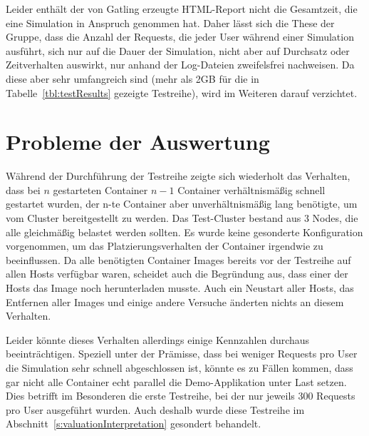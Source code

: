 Leider enth\"alt der von Gatling erzeugte HTML-Report nicht die Gesamtzeit, die eine Simulation in Anspruch genommen hat.
Daher l\"asst sich die These der Gruppe, dass die Anzahl der Requests, die jeder User w\"ahrend einer Simulation ausf\"uhrt, sich nur auf die Dauer der Simulation, nicht aber auf Durchsatz oder Zeitverhalten auswirkt, nur anhand der Log-Dateien zweifelsfrei nachweisen.
Da diese aber sehr umfangreich sind (mehr als 2GB f\"ur die in Tabelle~\ref{tbl:testResults} gezeigte Testreihe), wird im Weiteren darauf verzichtet.

\section{Probleme der Auswertung}
\label{s:valuationProblems}

W\"ahrend der Durchf\"uhrung der Testreihe zeigte sich wiederholt das Verhalten, dass bei $n$ gestarteten Container $n-1$ Container verh\"altnism\"a\ss{}ig schnell gestartet wurden, der n-te Container aber unverh\"altnism\"a\ss{}ig lang ben\"otigte, um vom Cluster bereitgestellt zu werden.
Das Test-Cluster bestand aus 3 Nodes, die alle gleichm\"a\ss{}ig belastet werden sollten.
Es wurde keine gesonderte Konfiguration vorgenommen, um das Platzierungsverhalten der Container irgendwie zu beeinflussen.
Da alle ben\"otigten Container Images bereits vor der Testreihe auf allen Hosts verf\"ugbar waren, scheidet auch die Begr\"undung aus, dass einer der Hosts das Image noch herunterladen musste.
Auch ein Neustart aller Hosts, das Entfernen aller Images und einige andere Versuche \"anderten nichts an diesem Verhalten.

Leider k\"onnte dieses Verhalten allerdings einige Kennzahlen durchaus beeintr\"achtigen.
Speziell unter der Pr\"amisse, dass bei weniger Requests pro User die Simulation sehr schnell abgeschlossen ist, k\"onnte es zu F\"allen kommen, dass gar nicht alle Container echt parallel die Demo-Applikation unter Last setzen.
Dies betrifft im Besonderen die erste Testreihe, bei der nur jeweils 300 Requests pro User ausgef\"uhrt wurden.
Auch deshalb wurde diese Testreihe im Abschnitt~\ref{s:valuationInterpretation} gesondert behandelt.

